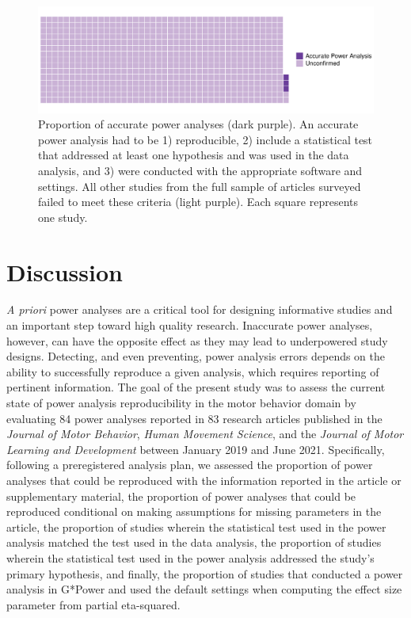 \documentclass[
  man, donotrepeattitle,mask,floatsintext]{apa7}
\begin{document}
\clearpage

\begin{figure}

{\centering \includegraphics{../../figs/fig4} 

}

\caption{\normalfont
Proportion of accurate power analyses (dark purple). An accurate power analysis had to be 1) reproducible, 2) include a statistical test that addressed at least one hypothesis and was used in the data analysis, and 3) were conducted with the appropriate software and settings. All other studies from the full sample of articles surveyed failed to meet these criteria (light purple). Each square represents one study.}\label{fig:fig4}
\end{figure}




\clearpage

\hypertarget{discussion}{%
\section{Discussion}\label{discussion}}

\emph{A priori} power analyses are a critical tool for designing informative studies and an important step toward high quality research. Inaccurate power analyses, however, can have the opposite effect as they may lead to underpowered study designs. Detecting, and even preventing, power analysis errors depends on the ability to successfully reproduce a given analysis, which requires reporting of pertinent information. The goal of the present study was to assess the current state of power analysis reproducibility in the motor behavior domain by evaluating 84 power analyses reported in 83 research articles published in the \emph{Journal of Motor Behavior}, \emph{Human Movement Science}, and the \emph{Journal of Motor Learning and Development} between January 2019 and June 2021. Specifically, following a preregistered analysis plan, we assessed the proportion of power analyses that could be reproduced with the information reported in the article or supplementary material, the proportion of power analyses that could be reproduced conditional on making assumptions for missing parameters in the article, the proportion of studies wherein the statistical test used in the power analysis matched the test used in the data analysis, the proportion of studies wherein the statistical test used in the power analysis addressed the study's primary hypothesis, and finally, the proportion of studies that conducted a power analysis in G*Power and used the default settings when computing the effect size parameter from partial eta-squared.
\end{document}
